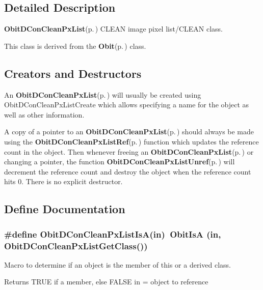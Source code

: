 \subsection{Detailed Description}
{\bf Obit\-DCon\-Clean\-Px\-List}{\rm (p.\,\pageref{structObitDConCleanPxList})} CLEAN image pixel list/CLEAN class. 

This class is derived from the {\bf Obit}{\rm (p.\,\pageref{structObit})} class.\subsection{Creators and Destructors}\label{ObitDConCleanPxList_8h_ObitDConCleanPxListaccess}
An {\bf Obit\-DCon\-Clean\-Px\-List}{\rm (p.\,\pageref{structObitDConCleanPxList})} will usually be created using Obit\-DCon\-Clean\-Px\-List\-Create which allows specifying a name for the object as well as other information.

A copy of a pointer to an {\bf Obit\-DCon\-Clean\-Px\-List}{\rm (p.\,\pageref{structObitDConCleanPxList})} should always be made using the {\bf Obit\-DCon\-Clean\-Px\-List\-Ref}{\rm (p.\,\pageref{ObitDConCleanPxList_8h_a1})} function which updates the reference count in the object. Then whenever freeing an {\bf Obit\-DCon\-Clean\-Px\-List}{\rm (p.\,\pageref{structObitDConCleanPxList})} or changing a pointer, the function {\bf Obit\-DCon\-Clean\-Px\-List\-Unref}{\rm (p.\,\pageref{ObitDConCleanPxList_8h_a0})} will decrement the reference count and destroy the object when the reference count hits 0. There is no explicit destructor.

\subsection{Define Documentation}
\subsubsection{\setlength{\rightskip}{0pt plus 5cm}\#define Obit\-DCon\-Clean\-Px\-List\-Is\-A(in)\ Obit\-Is\-A (in, Obit\-DCon\-Clean\-Px\-List\-Get\-Class())}\label{ObitDConCleanPxList_8h_a2}


Macro to determine if an object is the member of this or a derived class. 

Returns TRUE if a member, else FALSE in = object to reference 
